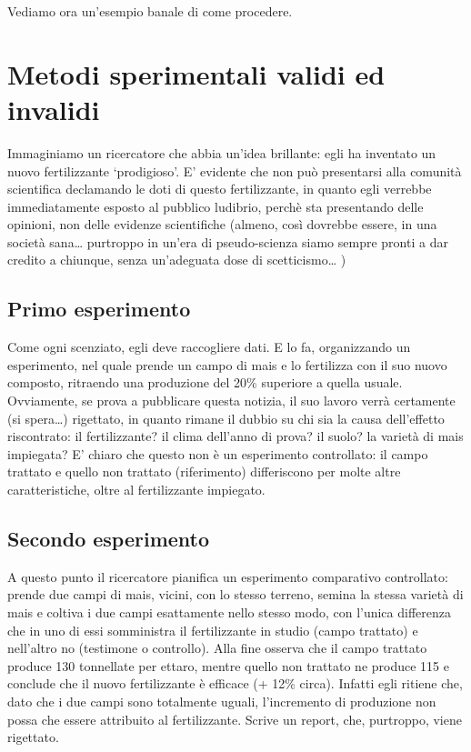 \documentclass[a4paper,12pt,oneside]{book}
\theoremstyle{definition}
\theoremstyle{definition}
\theoremstyle{definition}
\theoremstyle{remark}
\begin{document}
Vediamo ora un'esempio banale di come procedere.

\section{Metodi sperimentali validi ed
invalidi}\label{metodi-sperimentali-validi-ed-invalidi}

Immaginiamo un ricercatore che abbia un'idea brillante: egli ha
inventato un nuovo fertilizzante `prodigioso'. E' evidente che non può
presentarsi alla comunità scientifica declamando le doti di questo
fertilizzante, in quanto egli verrebbe immediatamente esposto al
pubblico ludibrio, perchè sta presentando delle opinioni, non delle
evidenze scientifiche (almeno, così dovrebbe essere, in una società
sana\ldots{} purtroppo in un'era di pseudo-scienza siamo sempre pronti a
dar credito a chiunque, senza un'adeguata dose di scetticismo\ldots{} )

\subsection{Primo esperimento}\label{primo-esperimento}

Come ogni scenziato, egli deve raccogliere dati. E lo fa, organizzando
un esperimento, nel quale prende un campo di mais e lo fertilizza con il
suo nuovo composto, ritraendo una produzione del 20\% superiore a quella
usuale. Ovviamente, se prova a pubblicare questa notizia, il suo lavoro
verrà certamente (si spera\ldots{}) rigettato, in quanto rimane il
dubbio su chi sia la causa dell'effetto riscontrato: il fertilizzante?
il clima dell'anno di prova? il suolo? la varietà di mais impiegata? E'
chiaro che questo non è un esperimento controllato: il campo trattato e
quello non trattato (riferimento) differiscono per molte altre
caratteristiche, oltre al fertilizzante impiegato.

\subsection{Secondo esperimento}\label{secondo-esperimento}

A questo punto il ricercatore pianifica un esperimento comparativo
controllato: prende due campi di mais, vicini, con lo stesso terreno,
semina la stessa varietà di mais e coltiva i due campi esattamente nello
stesso modo, con l'unica differenza che in uno di essi somministra il
fertilizzante in studio (campo trattato) e nell'altro no (testimone o
controllo). Alla fine osserva che il campo trattato produce 130
tonnellate per ettaro, mentre quello non trattato ne produce 115 e
conclude che il nuovo fertilizzante è efficace (+ 12\% circa). Infatti
egli ritiene che, dato che i due campi sono totalmente uguali,
l'incremento di produzione non possa che essere attribuito al
fertilizzante. Scrive un report, che, purtroppo, viene rigettato.
\end{document}
